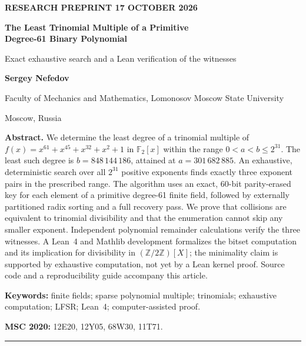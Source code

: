\documentclass[11pt,a4paper]{article}
\newcommand{\F}{\mathbb F}
\begin{document}
\thispagestyle{empty}
\vspace*{8mm}
{\small\bfseries\color{accent} RESEARCH PREPRINT \hfill 17 OCTOBER 2026}\par
\vspace{5mm}
{\huge\bfseries\color{ink} The Least Trinomial Multiple of a Primitive\\[1pt] Degree-61 Binary Polynomial}\par
\vspace{4mm}
{\Large\color{dim} Exact exhaustive search and a Lean verification of the witnesses}\par
\vspace{9mm}
{\large\bfseries Sergey Nefedov}\par
{\normalsize Faculty of Mechanics and Mathematics, Lomonosov Moscow State University}\par
\vspace{1mm}
{\small Moscow, Russia}\par
\vspace{9mm}
\noindent\textbf{Abstract.}\;
We determine the least degree of a trinomial multiple of
\(f(x)=x^{61}+x^{45}+x^{32}+x^2+1\) in \(\F_2[x]\) within the range
\(0<a<b\le 2^{31}\). The least such degree is
\(b=848\,144\,186\), attained at \(a=301\,682\,885\).
An exhaustive, deterministic search over all \(2^{31}\) positive exponents
finds exactly three exponent pairs in the prescribed range.
The algorithm uses an exact, 60-bit parity-erased key for each element of a
primitive degree-61 finite field, followed by externally partitioned radix
sorting and a full recovery pass. We prove that collisions are equivalent to
trinomial divisibility and that the enumeration cannot skip any smaller
exponent. Independent polynomial remainder calculations verify the three
witnesses. A Lean~4 and Mathlib development formalizes the bitset computation
and its implication for divisibility in \((\mathbb Z/2\mathbb Z)[X]\); the
minimality claim is supported by exhaustive computation, not yet by a Lean
kernel proof. Source code and a reproducibility guide accompany this article.
\par\vspace{4mm}
\noindent\textbf{Keywords:} finite fields; sparse polynomial multiple;
trinomials; exhaustive computation; LFSR; Lean~4; computer-assisted proof.\par
\noindent\textbf{MSC 2020:} 12E20, 12Y05, 68W30, 11T71.\par
\vspace{7mm}\hrule\vspace{6mm}
\end{document}
